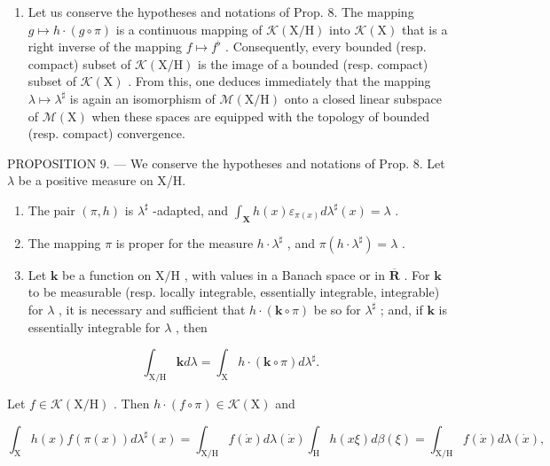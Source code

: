 \begin{enumerate}
\def\labelenumi{\arabic{enumi})}
\setcounter{enumi}{1}
\tightlist
\item
  Let us conserve the hypotheses and notations of Prop. 8. The mapping \(g \mapsto h \cdot (g \circ \pi)\) is a continuous mapping of \(\mathcal{K}(\mathrm{X / H})\) into \(\mathcal{K}(\mathrm{X})\) that is a right inverse of the mapping \(f \mapsto f^{\flat}\) . Consequently, every bounded (resp. compact) subset of \(\mathcal{K}(\mathrm{X / H})\) is the image of a bounded (resp. compact) subset of \(\mathcal{K}(\mathrm{X})\) . From this, one deduces immediately that the mapping \(\lambda \mapsto \lambda^{\sharp}\) is again an isomorphism of \(\mathcal{M}(\mathrm{X / H})\) onto a closed linear subspace of \(\mathcal{M}(\mathrm{X})\) when these spaces are equipped with the topology of bounded (resp. compact) convergence.
\end{enumerate}

PROPOSITION 9. --- We conserve the hypotheses and notations of Prop. 8. Let \(\lambda\) be a positive measure on X/H.

\begin{enumerate}
\def\labelenumi{\alph{enumi})}
\item
  The pair \((\pi, h)\) is \(\lambda^{\sharp}\) -adapted, and \(\int_{\mathbf{X}} h(x) \varepsilon_{\pi(x)} d\lambda^{\sharp}(x) = \lambda\) .
\item
  The mapping \(\pi\) is proper for the measure \(h\cdot \lambda^{\sharp}\) , and \(\pi (h\cdot \lambda^{\sharp}) = \lambda\) .
\item
  Let \(\mathbf{k}\) be a function on \(\mathrm{X / H}\) , with values in a Banach space or in \(\overline{\mathbf{R}}\) . For \(\mathbf{k}\) to be measurable (resp. locally integrable, essentially integrable, integrable) for \(\lambda\) , it is necessary and sufficient that \(h\cdot (\mathbf{k}\circ \pi)\) be so for \(\lambda^{\sharp}\) ; and, if \(\mathbf{k}\) is essentially integrable for \(\lambda\) , then
\end{enumerate}

\[
\int_ {\mathrm{X} / \mathrm{H}} \mathbf {k} d \lambda = \int_ {\mathrm{X}} h \cdot (\mathbf {k} \circ \pi) d \lambda^ {\sharp}.\tag{14}
\]

Let \(f \in \mathcal{K}(\mathrm{X}/\mathrm{H})\) . Then \(h \cdot (f \circ \pi) \in \mathcal{K}(\mathrm{X})\) and

\[
\int_ {\mathrm{X}} h (x) f (\pi (x)) d \lambda^ {\sharp} (x) = \int_ {\mathrm{X} / \mathrm{H}} f (\dot {x}) d \lambda (\dot {x}) \int_ {\mathrm{H}} h (x \xi) d \beta (\xi) = \int_ {\mathrm{X} / \mathrm{H}} f (\dot {x}) d \lambda (\dot {x}),
\]

